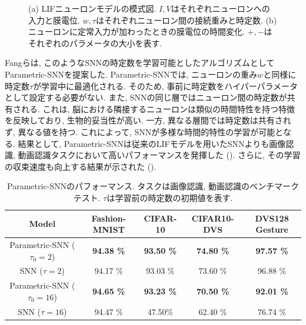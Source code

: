 \begin{figure}[htb]
{\begin{minipage}{0.657\textwidth}
            \label{fig:liffigure}
        \end{minipage}

        \caption[LIFモデルの模式図と膜電位の時間変化]{
            \cite{paramsnn}
            (a) LIFニューロンモデルの模式図. $I, V$はそれぞれニューロンへの入力と膜電位. 
            $w, \tau$はそれぞれニューロン間の接続重みと時定数. 
            (b) ニューロンに定常入力が加わったときの膜電位の時間変化. 
            $+, -$はそれぞれのパラメータの大小を表す.
        }
    }
\end{figure}

Fangらは, このようなSNNの時定数を学習可能としたアルゴリズムとしてParametric-SNNを提案した\cite{paramsnn}.
Parametric-SNNでは, ニューロンの重み$w$と同様に時定数$\tau$が学習中に最適化される.
そのため, 事前に時定数をハイパーパラメータとして設定する必要がない.
また, SNNの同じ層ではニューロン間の時定数が共有される.
これは, 脳における隣接するニューロンは類似の時間特性を持つ特徴を反映しており, 生物的妥当性が高い.
一方, 異なる層間では時定数は共有されず, 異なる値を持つ.
これによって, SNNが多様な時間的特性の学習が可能となる.
結果として, Parametric-SNNは従来のLIFモデルを用いたSNNよりも画像認識, 動画認識タスクにおいて高いパフォーマンスを発揮した ().
さらに, その学習の収束速度も向上する結果が示された ().
\begin{table}[htb]
    \centering
    \caption[Parametric-SNNのパフォーマンス]{
        Parametric-SNNのパフォーマンス\cite{paramsnn}.
        タスクは画像認識, 動画認識のベンチマークテスト. 
        $\tau$は学習前の時定数の初期値を表す.
    }
    \label{tab:paramsnn:result1}
    {\small %
    \begin{tabular}{ccccc}
        \hline
        Model & Fashion-MNIST & CIFAR-10 & CIFAR10-DVS & DVS128 Gesture\\
        \hline
        Parametric-SNN ($\tau_0=2$) & \textbf{94.38 \%} & \textbf{93.50 \%} & \textbf{74.80 \%} & \textbf{97.57 \%}\\
        SNN ($\tau=2$) & 94.17 \% & 93.03 \% & 73.60 \% & 96.88 \%\\
        \hline
        Parametric-SNN ($\tau_0=16$) & \textbf{94.65 \%} & \textbf{93.23 \%} & \textbf{70.50 \%} & \textbf{92.01 \%}\\
        SNN ($\tau=16$) & 94.47 \% & 47.50\% & 62.40 \% & 76.74 \%\\
        \hline
    \end{tabular}
    }
\end{table}

